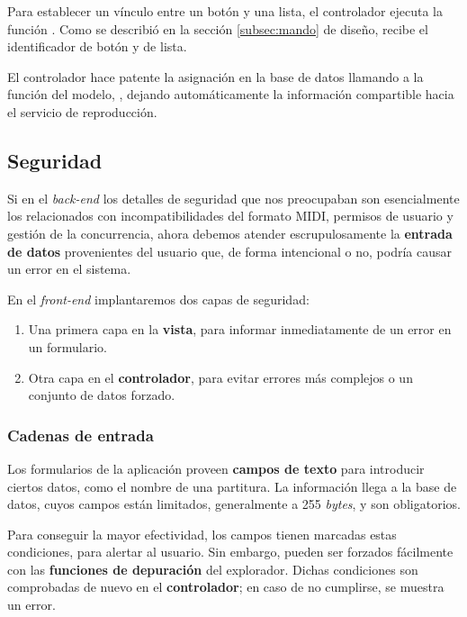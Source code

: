 Para establecer un vínculo entre un botón y una lista, el controlador ejecuta la función . Como se describió en la sección \ref{subsec:mando} de diseño, recibe el identificador de botón y de lista.

El controlador hace patente la asignación en la base de datos llamando a la función del modelo, , dejando automáticamente la información compartible hacia el servicio de reproducción.

\subsection{Seguridad}
\label{subsec:web_seguridad}

Si en el \textit{back-end} los detalles de seguridad que nos preocupaban son esencialmente los relacionados con incompatibilidades del formato \acrshort{MIDI}, permisos de usuario y gestión de la concurrencia, ahora debemos atender escrupulosamente la \textbf{entrada de datos} provenientes del usuario que, de forma intencional o no, podría causar un error en el sistema.

En el \textit{front-end} implantaremos dos capas de seguridad:

\begin{enumerate}
	\item Una primera capa en la \textbf{vista}, para informar inmediatamente de un error en un formulario.
	\item Otra capa en el \textbf{controlador}, para evitar errores más complejos o un conjunto de datos forzado.
\end{enumerate}

\subsubsection{Cadenas de entrada}

Los formularios de la aplicación proveen \textbf{campos de texto} para introducir ciertos datos, como el nombre de una partitura. La información llega a la base de datos, cuyos campos están limitados, generalmente a 255 \textit{bytes}, y son obligatorios.

Para conseguir la mayor efectividad, los campos  tienen marcadas estas condiciones, para alertar al usuario. Sin embargo, pueden ser forzados fácilmente con las \textbf{funciones de depuración} del explorador. Dichas condiciones son comprobadas de nuevo en el \textbf{controlador}; en caso de no cumplirse, se muestra un error.

